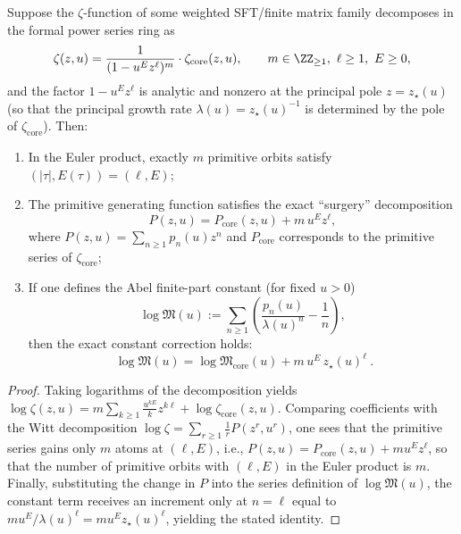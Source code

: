 \begin{proposition}\label{prop:primitive-orbit-surgery}
Suppose the \(\zeta\)-function of some weighted SFT/finite matrix family decomposes in the formal power series ring as
\[
\zeta(z,u)=\frac{1}{(1-u^{E}z^{\ell})^{m}}\cdot \zeta_{\mathrm{core}}(z,u),
\qquad m\in\ZZ_{\ge 1},\ \ell\ge 1,\ E\ge 0,
\]
and the factor \(1-u^{E}z^{\ell}\) is analytic and nonzero at the principal pole \(z=z_\star(u)\) (so that the principal growth rate \(\lambda(u)=z_\star(u)^{-1}\) is determined by the pole of \(\zeta_{\mathrm{core}}\)).
Then:
\begin{enumerate}
  \item In the Euler product, exactly \(m\) primitive orbits satisfy \((|\tau|,E(\tau))=(\ell,E)\);
  \item The primitive generating function satisfies the exact ``surgery'' decomposition
  \[
  P(z,u)=P_{\mathrm{core}}(z,u)+m\,u^{E}z^{\ell},
  \]
  where \(P(z,u)=\sum_{n\ge 1}p_n(u)z^n\) and \(P_{\mathrm{core}}\) corresponds to the primitive series of \(\zeta_{\mathrm{core}}\);
  \item If one defines the Abel finite-part constant (for fixed \(u>0\))
  \[
  \log\mathfrak{M}(u):=\sum_{n\ge 1}\left(\frac{p_n(u)}{\lambda(u)^n}-\frac{1}{n}\right),
  \]
  then the exact constant correction holds:
  \[
  \boxed{\ \log\mathfrak{M}(u)=\log\mathfrak{M}_{\mathrm{core}}(u)+m\,u^{E}\,z_\star(u)^{\ell}\ }.
  \]
\end{enumerate}
\end{proposition}
\begin{proof}
Taking logarithms of the decomposition yields
\(
\log\zeta(z,u)=m\sum_{k\ge 1}\frac{u^{kE}}{k}z^{k\ell}+\log\zeta_{\mathrm{core}}(z,u)
\).
Comparing coefficients with the Witt decomposition \(\log\zeta=\sum_{r\ge 1}\frac{1}{r}P(z^{r},u^{r})\), one sees that the primitive series gains only \(m\) atoms at \((\ell,E)\), i.e.,
\(
P(z,u)=P_{\mathrm{core}}(z,u)+m u^{E}z^{\ell}
\), so that the number of primitive orbits with \((\ell,E)\) in the Euler product is \(m\).
Finally, substituting the change in \(P\) into the series definition of \(\log\mathfrak{M}(u)\), the constant term receives an increment only at \(n=\ell\) equal to \(m u^{E}/\lambda(u)^{\ell}=m u^{E}z_\star(u)^{\ell}\), yielding the stated identity.
\end{proof}

